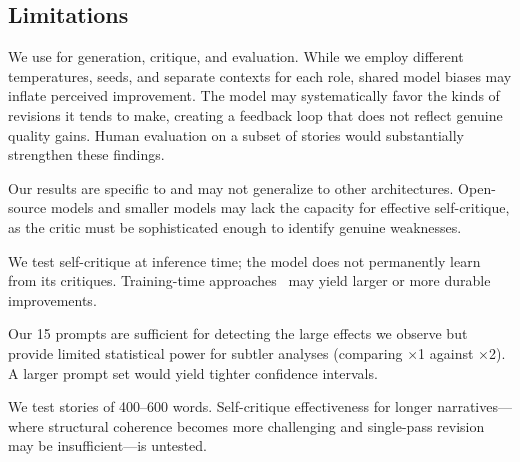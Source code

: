 \subsection{Limitations}
\label{sec:limitations}

We use \gptfour for generation, critique, and evaluation.
While we employ different temperatures, seeds, and separate contexts for each role, shared model biases may inflate perceived improvement.
The model may systematically favor the kinds of revisions it tends to make, creating a feedback loop that does not reflect genuine quality gains.
Human evaluation on a subset of stories would substantially strengthen these findings.

Our results are specific to \gptfour and may not generalize to other architectures.
Open-source models and smaller models may lack the capacity for effective self-critique, as the critic must be sophisticated enough to identify genuine weaknesses.

We test self-critique at inference time; the model does not permanently learn from its critiques.
Training-time approaches~\citep{jia2025writingzero, yuan2024selfrewarding} may yield larger or more durable improvements.

Our 15 prompts are sufficient for detecting the large effects we observe but provide limited statistical power for subtler analyses (\eg comparing \selfrefine $\times$1 against $\times$2).
A larger prompt set would yield tighter confidence intervals.

We test stories of 400--600 words.
Self-critique effectiveness for longer narratives---where structural coherence becomes more challenging and single-pass revision may be insufficient---is untested.
